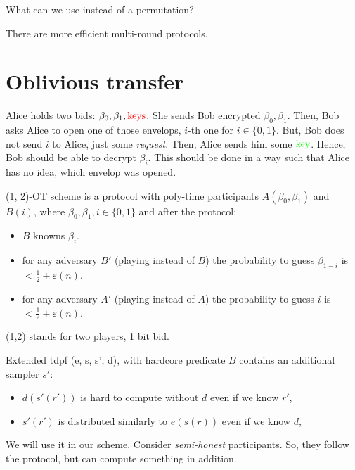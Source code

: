 \begin{exercise}
    What can we use instead of a permutation?
\end{exercise}

\begin{remark}
    There are more efficient multi-round protocols.
\end{remark}

\section{Oblivious transfer}

Alice holds two bids: $\beta_0, \beta_1, \textcolor{red}{\text{keys}}$.
She sends Bob encrypted $\beta_0, \beta_1$.
Then, Bob asks Alice to open one of those envelops, $i$-th one for $i \in \{0, 1\}$.
But, Bob does not send $i$ to Alice, just some \textit{request}.
Then, Alice sends him some $\textcolor{green}{\text{key}}$.
Hence, Bob should be able to decrypt $\beta_i$.
This should be done in a way such that Alice has no idea, which envelop was opened.

\begin{definition}[(1,2)-OT]
    (1, 2)-OT scheme is a protocol with poly-time participants $A(\beta_0, \beta_1)$ and $B(i)$, where $\beta_0, \beta_1, i \in \{0, 1\}$ and after the protocol:
    \begin{itemize}
        \item $B$ knowns $\beta_i$.
	\item for any adversary $B'$ (playing instead of $B$) the probability to guess $\beta_{1 - i}$ is $< \frac{1}{2} + \varepsilon(n)$.
	\item for any adversary $A'$ (playing instead of $A$) the probability to guess $i$ is $< \frac{1}{2} + \varepsilon(n)$.
    \end{itemize}
\end{definition}
(1,2) stands for two players, 1 bit bid.

\begin{definition}
    Extended tdpf (e, s, s', d), with hardcore predicate $B$ contains an additional sampler $s'$:
    \begin{itemize}
        \item $d(s'(r'))$ is hard to compute without $d$ even if we know $r'$,
	\item $s'(r')$ is distributed similarly to $e(s(r))$ even if we know $d$,
    \end{itemize}
\end{definition}
We will use it in our scheme.
Consider \emph{semi-honest} participants.
So, they follow the protocol, but can compute something in addition.

